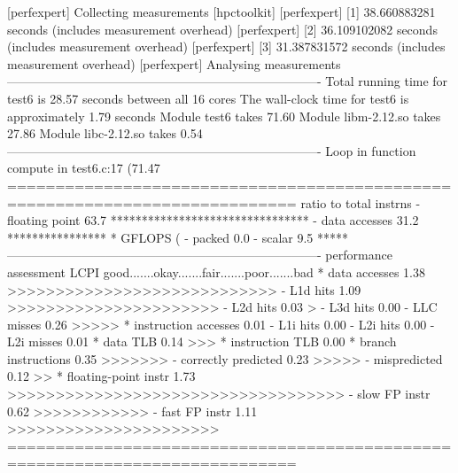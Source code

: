 \begin{prompt}
[perfexpert] Collecting measurements [hpctoolkit]
[perfexpert]    [1] 38.660883281 seconds (includes measurement overhead)
[perfexpert]    [2] 36.109102082 seconds (includes measurement overhead)
[perfexpert]    [3] 31.387831572 seconds (includes measurement overhead)
[perfexpert] Analysing measurements
----------------------------------------------------------------------------
Total running time for test6 is 28.57 seconds between all 16 cores
The wall-clock time for test6 is approximately 1.79 seconds
Module test6 takes 71.60%
Module libm-2.12.so takes 27.86%
Module libc-2.12.so takes 0.54%
----------------------------------------------------------------------------
Loop in function compute in test6.c:17 (71.47%
============================================================================
ratio to total instrns    %
 - floating point       63.7 ********************************
 - data accesses        31.2 ****************
* GFLOPS (%
 - packed                0.0
 - scalar                9.5 *****
----------------------------------------------------------------------------
performance assessment  LCPI good.......okay.......fair.......poor.......bad
* data accesses         1.38 >>>>>>>>>>>>>>>>>>>>>>>>>>>>
 - L1d hits             1.09 >>>>>>>>>>>>>>>>>>>>>>
 - L2d hits             0.03 >
 - L3d hits             0.00
 - LLC misses           0.26 >>>>>
* instruction accesses  0.01
 - L1i hits             0.00
 - L2i hits             0.00
 - L2i misses           0.01
* data TLB              0.14 >>>
* instruction TLB       0.00
* branch instructions   0.35 >>>>>>>
 - correctly predicted  0.23 >>>>>
 - mispredicted         0.12 >>
* floating-point instr  1.73 >>>>>>>>>>>>>>>>>>>>>>>>>>>>>>>>>>>
 - slow FP instr        0.62 >>>>>>>>>>>>
 - fast FP instr        1.11 >>>>>>>>>>>>>>>>>>>>>>
============================================================================
\end{prompt}

